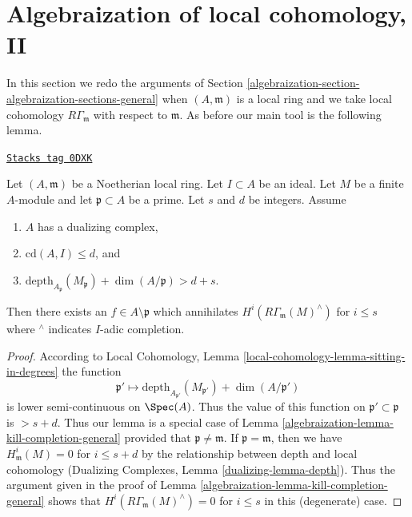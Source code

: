 \section{Algebraization of local cohomology, II}
\label{algebraization-section-algebraization-punctured}
In this section we redo the arguments of
Section \ref{algebraization-section-algebraization-sections-general}
when $(A, \mathfrak m)$ is a local ring and we take local cohomology
$R\Gamma_\mathfrak m$ with respect to $\mathfrak m$. As before our
main tool is the following lemma.

\begin{lemma}
\label{algebraization-lemma-kill-completion}
\href{https://stacks.math.columbia.edu/tag/0DXK}{\texttt{Stacks tag 0DXK}}

Let $(A, \mathfrak m)$ be a Noetherian local ring.
Let $I \subset A$ be an ideal. Let $M$ be a finite $A$-module and
let $\mathfrak p \subset A$ be a prime. Let $s$ and $d$ be integers. Assume
\begin{enumerate}
\item $A$ has a dualizing complex,
\item $\text{cd}(A, I) \leq d$, and
\item
$\text{depth}_{A_\mathfrak p}(M_\mathfrak p) + \dim(A/\mathfrak p) > d + s$.
\end{enumerate}
Then there exists an $f \in A \setminus \mathfrak p$ which annihilates
$H^i(R\Gamma_\mathfrak m(M)^\wedge)$ for $i \leq s$ where ${}^\wedge$
indicates $I$-adic completion.
\end{lemma}

\begin{proof}

According to Local Cohomology, Lemma
\ref{local-cohomology-lemma-sitting-in-degrees}
the function
$$
\mathfrak p' \longmapsto
\text{depth}_{A_{\mathfrak p'}}(M_{\mathfrak p'}) + \dim(A/\mathfrak p')
$$
is lower semi-continuous on $\Spec(A)$. Thus the value
of this function on $\mathfrak p' \subset \mathfrak p$
is $> s + d$. Thus our lemma is a special case of
Lemma \ref{algebraization-lemma-kill-completion-general}
provided that $\mathfrak p \not = \mathfrak m$.
If $\mathfrak p = \mathfrak m$,
then we have $H^i_\mathfrak m(M) = 0$ for $i \leq s + d$ by
the relationship between depth and local cohomology
(Dualizing Complexes, Lemma \ref{dualizing-lemma-depth}).
Thus the argument given in the proof of
Lemma \ref{algebraization-lemma-kill-completion-general}
shows that $H^i(R\Gamma_\mathfrak m(M)^\wedge) = 0$
for $i \leq s$ in this (degenerate) case.
\end{proof}

